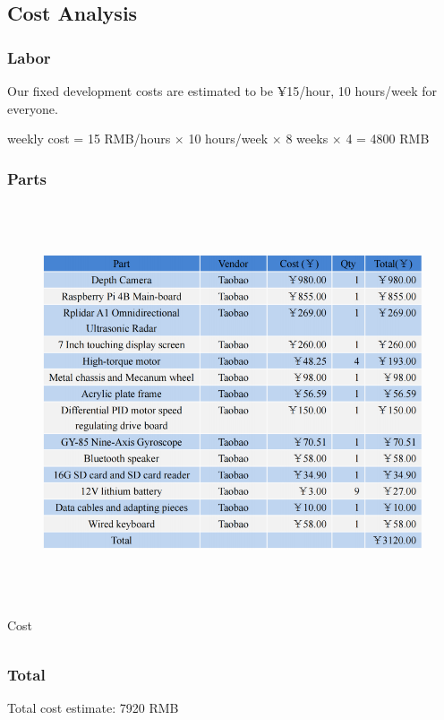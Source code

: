 \subsection{Cost Analysis}

\subsubsection{Labor}
Our fixed development costs are estimated to be ¥15/hour, 10 hours/week for everyone. 

weekly cost = 15 RMB/hours $\times$ 10 hours/week $\times$ 8 weeks $\times$ 4 = 4800 RMB


\subsubsection{Parts}
\begin{figure}[H]
    \centering
    \includegraphics[width=15cm,height=11.7cm]{sections/costlist.png}
\end{figure}
\begin{table}[H]
    \centering
    \begin{tabular}{c|c}
    \end{tabular}
    \caption{Cost}
\end{table}


\subsubsection{Total}
Total cost estimate: 7920 RMB


